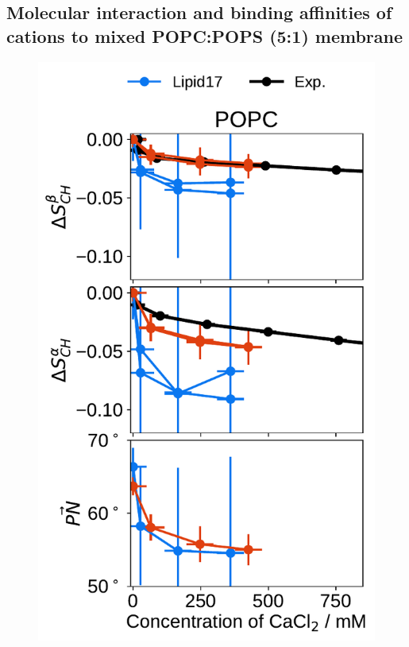 \documentclass[journal=jpcbfk,manuscript=article]{achemso}
\newlength{\figwidth}
\newlength{\figwidthsmall}
\begin{document}
\subsection{Molecular interaction and binding affinities of  cations to mixed POPC:POPS (5:1) membrane} 
\label{section:lip-ion_ca}



\begin{figure}[tbp!] 
  \centering 
  \includegraphics[width=\figwidthsmall]{../img/ecc_pops/order_parameters_changes_ecc-lip_L14_A-B-PN-COO_POPC_cacl.pdf} 

\end{figure}
\end{document}
